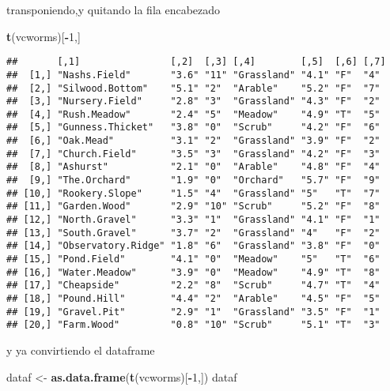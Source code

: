 \documentclass[]{article}
\newenvironment{Shaded}{\begin{snugshade}}{\end{snugshade}}
\newcommand{\KeywordTok}[1]{\textcolor[rgb]{0.13,0.29,0.53}{\textbf{#1}}}
\newcommand{\DecValTok}[1]{\textcolor[rgb]{0.00,0.00,0.81}{#1}}
\newcommand{\StringTok}[1]{\textcolor[rgb]{0.31,0.60,0.02}{#1}}
\newcommand{\OperatorTok}[1]{\textcolor[rgb]{0.81,0.36,0.00}{\textbf{#1}}}
\newcommand{\NormalTok}[1]{#1}
\begin{document}
transponiendo,y quitando la fila encabezado

\begin{Shaded}
\begin{Highlighting}[]
\KeywordTok{t}\NormalTok{(vcworms)[}\OperatorTok{-}\DecValTok{1}\NormalTok{,]}
\end{Highlighting}
\end{Shaded}

\begin{verbatim}
##       [,1]                [,2]  [,3] [,4]        [,5]  [,6] [,7]
##  [1,] "Nashs.Field"       "3.6" "11" "Grassland" "4.1" "F"  "4" 
##  [2,] "Silwood.Bottom"    "5.1" "2"  "Arable"    "5.2" "F"  "7" 
##  [3,] "Nursery.Field"     "2.8" "3"  "Grassland" "4.3" "F"  "2" 
##  [4,] "Rush.Meadow"       "2.4" "5"  "Meadow"    "4.9" "T"  "5" 
##  [5,] "Gunness.Thicket"   "3.8" "0"  "Scrub"     "4.2" "F"  "6" 
##  [6,] "Oak.Mead"          "3.1" "2"  "Grassland" "3.9" "F"  "2" 
##  [7,] "Church.Field"      "3.5" "3"  "Grassland" "4.2" "F"  "3" 
##  [8,] "Ashurst"           "2.1" "0"  "Arable"    "4.8" "F"  "4" 
##  [9,] "The.Orchard"       "1.9" "0"  "Orchard"   "5.7" "F"  "9" 
## [10,] "Rookery.Slope"     "1.5" "4"  "Grassland" "5"   "T"  "7" 
## [11,] "Garden.Wood"       "2.9" "10" "Scrub"     "5.2" "F"  "8" 
## [12,] "North.Gravel"      "3.3" "1"  "Grassland" "4.1" "F"  "1" 
## [13,] "South.Gravel"      "3.7" "2"  "Grassland" "4"   "F"  "2" 
## [14,] "Observatory.Ridge" "1.8" "6"  "Grassland" "3.8" "F"  "0" 
## [15,] "Pond.Field"        "4.1" "0"  "Meadow"    "5"   "T"  "6" 
## [16,] "Water.Meadow"      "3.9" "0"  "Meadow"    "4.9" "T"  "8" 
## [17,] "Cheapside"         "2.2" "8"  "Scrub"     "4.7" "T"  "4" 
## [18,] "Pound.Hill"        "4.4" "2"  "Arable"    "4.5" "F"  "5" 
## [19,] "Gravel.Pit"        "2.9" "1"  "Grassland" "3.5" "F"  "1" 
## [20,] "Farm.Wood"         "0.8" "10" "Scrub"     "5.1" "T"  "3"
\end{verbatim}

y ya convirtiendo el dataframe

\begin{Shaded}
\begin{Highlighting}[]
\NormalTok{dataf <-}\StringTok{ }\KeywordTok{as.data.frame}\NormalTok{(}\KeywordTok{t}\NormalTok{(vcworms)[}\OperatorTok{-}\DecValTok{1}\NormalTok{,])}
\NormalTok{dataf}
\end{Highlighting}
\end{Shaded}
\end{document}
